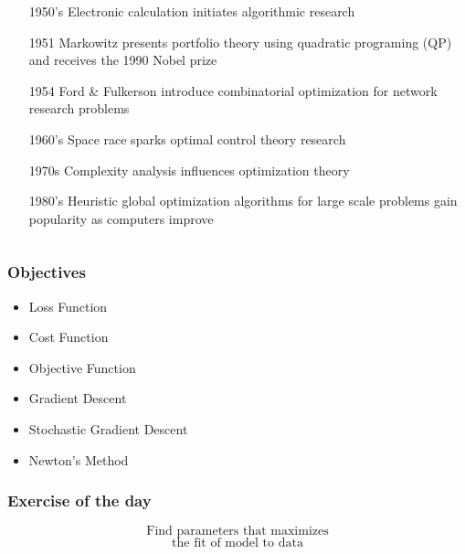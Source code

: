 \documentclass[xcolor={dvipsnames}]{beamer}
\begin{document}
{\begin{columns}
\begin{column}{.53\textwidth}
\begin{itemize}
\item[1950's] Electronic calculation initiates algorithmic research

\item[1951] Markowitz presents portfolio theory using quadratic programing (QP) 
and receives the 1990 Nobel prize

\item[1954] Ford \& Fulkerson introduce combinatorial optimization for network research problems

\item[1960's] Space race sparks optimal control theory research

\item[1970s] Complexity analysis influences optimization theory
\item[1980's] Heuristic global optimization algorithms for large scale problems gain popularity
as computers improve
\end{itemize}

\end{column}
\end{columns}


}



\frame
{
\LARGE
 \frametitle{Objectives}

\begin{itemize}
\item Loss Function
\item Cost Function 
\item Objective Function
\item[]
\item Gradient Descent
\item Stochastic Gradient Descent
\item Newton's Method
\end{itemize}

\begin{figure}
\centering

\normalsize
 
\end{figure}

}

\frame
{
\normalsize
\frametitle{Exercise of the day}

\huge
\vspace{-2em}
$$\text{Find parameters that maximizes}$$
\vspace{-2em}
$$\text{the fit of model to data}$$
\vspace{-1em}
\vspace{-1em}
}
\end{document}
